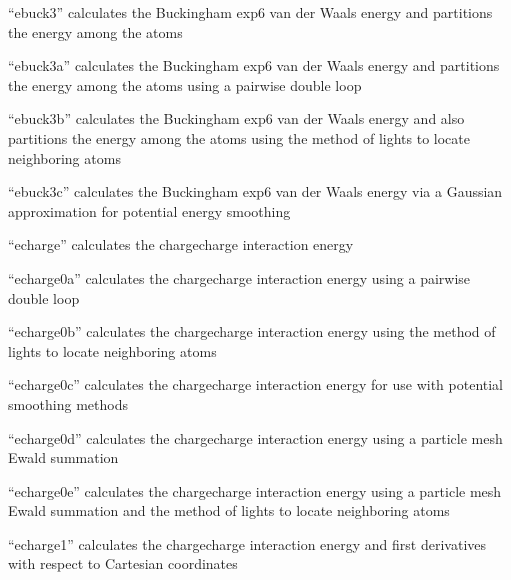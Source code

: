 \documentclass[letterpaper,11pt,english]{sphinxmanual}
\begin{document}

“ebuck3” calculates the Buckingham exp\sphinxhyphen{}6 van der Waals energy and partitions the energy among the atoms


“ebuck3a” calculates the Buckingham exp\sphinxhyphen{}6 van der Waals energy and partitions the energy among the atoms using a pairwise double loop


“ebuck3b” calculates the Buckingham exp\sphinxhyphen{}6 van der Waals energy and also partitions the energy among the atoms using the method of lights to locate neighboring atoms


“ebuck3c” calculates the Buckingham exp\sphinxhyphen{}6 van der Waals energy via a Gaussian approximation for potential energy smoothing


“echarge” calculates the charge\sphinxhyphen{}charge interaction energy


“echarge0a” calculates the charge\sphinxhyphen{}charge interaction energy using a pairwise double loop


“echarge0b” calculates the charge\sphinxhyphen{}charge interaction energy using the method of lights to locate neighboring atoms


“echarge0c” calculates the charge\sphinxhyphen{}charge interaction energy for use with potential smoothing methods


“echarge0d” calculates the charge\sphinxhyphen{}charge interaction energy using a particle mesh Ewald summation


“echarge0e” calculates the charge\sphinxhyphen{}charge interaction energy using a particle mesh Ewald summation and the method of lights to locate neighboring atoms


“echarge1” calculates the charge\sphinxhyphen{}charge interaction energy and first derivatives with respect to Cartesian coordinates
\end{document}
